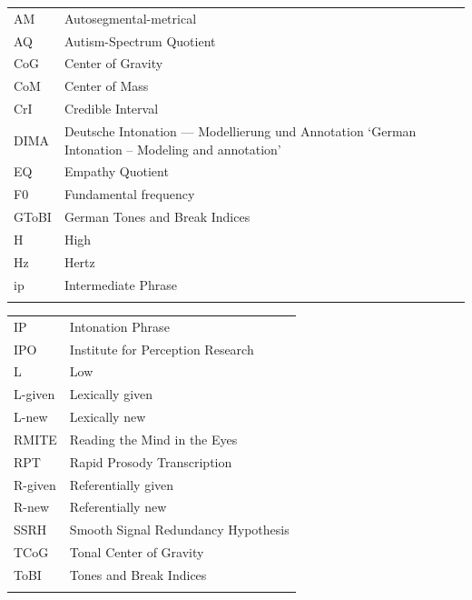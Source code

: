 \addchap{\lsAbbreviationsTitle}

\begin{tabularx}{.45\textwidth}{lQ}
AM & Autosegmental-metrical\\
AQ & Autism-Spectrum Quotient\\
CoG & Center of Gravity\\
CoM & Center of Mass\\
CrI & Credible Interval\\
DIMA & Deutsche Intonation --- Modellierung und Annotation `German Intonation -- Modeling and annotation'\\
EQ & Empathy Quotient\\
F0 & Fundamental frequency\\
GToBI & German Tones and Break Indices\\
H & High\\
Hz & Hertz\\
ip & Intermediate Phrase\\
\\
\end{tabularx}
\begin{tabularx}{.45\textwidth}{lQ}
IP & Intonation Phrase\\
IPO & Institute for Perception Research\\
L & Low\\
L-given & Lexically given\\
L-new & Lexically new\\
RMITE & Reading the Mind in the Eyes\\
RPT & Rapid Prosody Transcription\\
R-given & Referentially given\\
R-new & Referentially new\\
SSRH & Smooth Signal Redundancy Hypothesis\\
TCoG & Tonal Center of Gravity\\
ToBI & Tones and Break Indices\\
\\
\end{tabularx}


